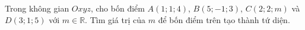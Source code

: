 \begin{ex}
Trong không gian $Oxyz$, cho bốn điểm $A(1;1;4)$, $B(5;-1;3)$, $C(2;2;m)$ và $D(3;1;5)$ với $m\in\mathbb R$. Tìm giá trị của $m$ để bốn điểm trên tạo thành tứ diện.
\end{ex}
